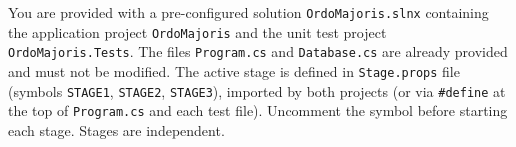 \documentclass[11pt,a4paper,addpoints]{exam}
\begin{document}

\cellwidth{2.75cm}
\noindent \gradetable[h]

\vspace{0.4cm}

You are provided with a pre-configured solution \texttt{OrdoMajoris.slnx} containing the application project \texttt{OrdoMajoris} and the unit test project \texttt{OrdoMajoris.Tests}. The files \texttt{Program.cs} and \texttt{Database.cs} are already provided and must not be modified. The active stage is defined in \texttt{Stage.props} file (symbols \texttt{STAGE1}, \texttt{STAGE2}, \texttt{STAGE3}), imported by both projects  \break (or via \texttt{\#define} at the top of \texttt{Program.cs} and each test file). Uncomment the symbol before starting each stage. Stages are independent.
\end{document}
